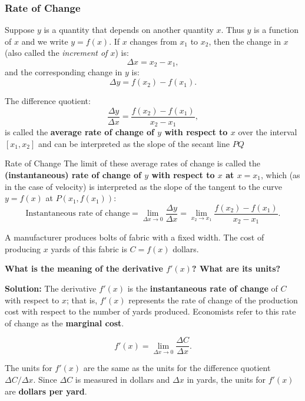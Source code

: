 \documentclass[12pt]{article}
\theoremstyle{beautifulthm}
\begin{document}
\subsubsection{Rate of Change}
Suppose \(y\) is a quantity that depends on another quantity \(x\). Thus \(y\) is a function of \(x\) and we write \(y = f(x)\). If \(x\) changes from \(x_1\) to \(x_2\), then the change in \(x\) (also called the \textit{increment of \(x\)}) is:
\[
\Delta x = x_2 - x_1,
\]
and the corresponding change in \(y\) is:
\[
\Delta y = f(x_2) - f(x_1).
\]

The difference quotient:
\[
\frac{\Delta y}{\Delta x} = \frac{f(x_2) - f(x_1)}{x_2 - x_1},
\]
is called the \textbf{average rate of change of \(y\) with respect to \(x\)} over the interval \([x_1, x_2]\) and can be interpreted as the slope of the secant line \(PQ\)



\bigskip




\begin{Definition}{ Rate of Change}{}
The limit of these average rates of change is called the \textbf{(instantaneous) rate of change of \(y\) with respect to \(x\) at \(x = x_1\)}, which (as in the case of velocity) is interpreted as the slope of the tangent to the curve \(y = f(x)\) at \(P(x_1, f(x_1))\):
\[
\text{Instantaneous rate of change} = \lim_{\Delta x \to 0} \frac{\Delta y}{\Delta x} = \lim_{x_2 \to x_1} \frac{f(x_2) - f(x_1)}{x_2 - x_1}.
\]


\end{Definition}


\begin{tcolorbox}[colback=examplebg, colframe=red!75!black, title=\textbf{EXAMPLE 2:Understanding the Derivative in a Practical Context}, fonttitle=\bfseries, sharp corners]
A manufacturer produces bolts of fabric with a fixed width. The cost of producing \(x\) yards of this fabric is \(C = f(x)\) dollars.

\vspace{3mm}
\textbf{ What is the meaning of the derivative \(f'(x)\)? What are its units?}
\vspace{5mm}
\tcblower

\textbf{Solution:} The derivative \(f'(x)\) is the \textbf{instantaneous rate of change} of \(C\) with respect to \(x\); that is, \(f'(x)\) represents the rate of change of the production cost with respect to the number of yards produced. Economists refer to this rate of change as the \textbf{marginal cost}.

\[
f'(x) = \lim_{\Delta x \to 0} \frac{\Delta C}{\Delta x}.
\]

The units for \(f'(x)\) are the same as the units for the difference quotient \(\Delta C / \Delta x\). Since \(\Delta C\) is measured in dollars and \(\Delta x\) in yards, the units for \(f'(x)\) are \textbf{dollars per yard}.

\end{tcolorbox}
\end{document}
